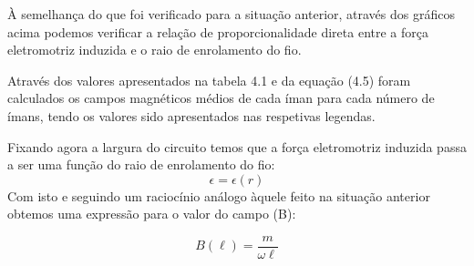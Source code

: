 \documentclass[11pt]{report}
\begin{document}
À semelhança do que foi verificado para a situação anterior, através dos gráficos acima podemos verificar a relação de proporcionalidade direta entre a força eletromotriz induzida e o raio de enrolamento do fio.

Através dos valores apresentados na tabela 4.1 e da equação (4.5) foram calculados os campos magnéticos médios de cada íman para cada número de ímans, tendo os valores sido apresentados nas respetivas legendas.



Fixando agora a largura do circuito temos que a força eletromotriz induzida passa a ser uma função do raio de enrolamento do fio:
\begin{equation}
	\epsilon = \epsilon (r)
\end{equation}
Com isto e seguindo um raciocínio análogo àquele feito na situação anterior obtemos uma expressão para o valor do campo (B):

\begin{equation}
	B(\ell) = \frac{m}{\omega \ell}
\end{equation}
\end{document}
